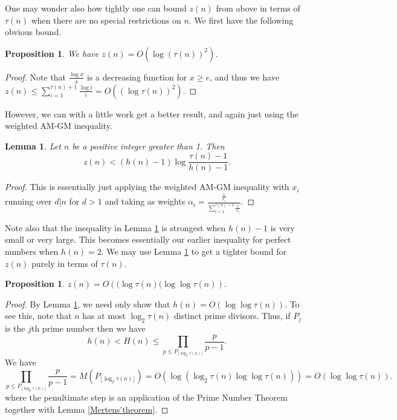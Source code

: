 \documentclass{article}
\newtheorem{lemma}[theorem]{Lemma}
\newtheorem{proposition}[theorem]{Proposition}
\begin{document}
One may wonder also how tightly one can bound $z(n)$ from above in terms of $\tau(n)$ when there are no special restrictions on $n$. We first have the following obvious bound.

\begin{proposition} We have $z(n) = O\left(\log (\tau(n))^2\right )$. \label{z(n) upper bound or arbitrary integers}
\end{proposition}
\begin{proof} Note that $\frac{\log x}{x}$ is a decreasing function for $x \geq e$, and thus we have $z(n) \leq \sum_{i=1}^{\tau(n)+1} \frac{\log i}{i} = O((\log \tau(n))^2).$
\end{proof}


However, we can with a little work get a better result, and again just using the weighted AM-GM inequality.

\begin{lemma} Let $n$ be a positive integer greater than 1. Then $$z(n) < \left(h(n)-1\right)\log \frac{\tau(n)-1}{h(n)-1}.$$ \label{z(n) < h log tau}
\end{lemma}

\begin{proof} This is essentially just applying the weighted AM-GM inequality with $x_i$ running over $d|n$ for $d>1$ and 
taking as weights $\alpha_i = \frac{\frac{1}{x_i}}{\sum_{i=1}^{\tau(n)-1} \frac{1}{x_i}}.$
\end{proof}
Note also that the inequality in Lemma \ref{z(n) < h log tau} is strongest when $h(n)-1$ is very small or very large. This becomes essentially our earlier inequality for perfect numbers when $h(n)=2$. We may use Lemma \ref{z(n) < h log tau}  to get a tighter bound for $z(n)$ purely in terms of $\tau(n)$. 

\begin{proposition}
 $z(n)= O\left( (\log \tau(n)(\log \log \tau(n) \right)$.
\end{proposition}
\begin{proof} By Lemma \ref{z(n) < h log tau}, we need only show that $h(n) = O( \log \log \tau(n))$. To see this, note that $n$ has at most $\log_2 \tau(n)$ distinct prime divisors. Thus, if $P_j$ is the $j$th prime number then we have $$h(n) < H(n) \leq \prod_{p \leq P_{\lfloor \log_2 \tau(n) \rfloor}} \frac{p}{p-1} .$$ We have  $$ \prod_{p \leq P_{\lfloor \log_2 \tau(n) \rfloor}} \frac{p}{p-1}  = M(P_{\lfloor \log_2 \tau(n) \rfloor}) = O\left(\log (\log_2 \tau(n) \log \log \tau(n))\right) = O(\log \log \tau(n)).  $$
where the penultimate step is an application of the Prime Number Theorem together with Lemma \ref{Mertens'theorem}.
\end{proof}
\end{document}
